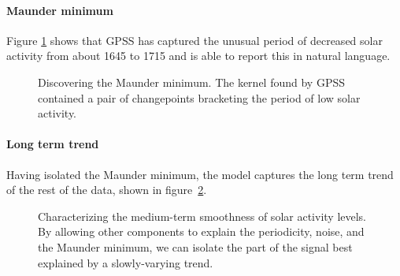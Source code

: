 \documentclass{article}
\begin{document}

\paragraph{Maunder minimum}

Figure \ref{fig:maunder} shows that GPSS has captured the unusual period of decreased solar activity from about 1645 to 1715 and is able to report this in natural language.

\begin{figure}[ht]
\centering
{}
\caption{Discovering the Maunder minimum.  The kernel found by GPSS contained a pair of changepoints bracketing the period of low solar activity.}
\label{fig:maunder}
\end{figure}

\paragraph{Long term trend}

Having isolated the Maunder minimum, the model captures the long term trend of the rest of the data, shown in figure~\ref{fig:smooth}.

\begin{figure}[h!]
\centering
{}
\caption{Characterizing the medium-term smoothness of solar activity levels.  By allowing other components to explain the periodicity, noise, and the Maunder minimum, we can isolate the part of the signal best explained by a slowly-varying trend.}
\label{fig:smooth}
\end{figure}
\end{document}
